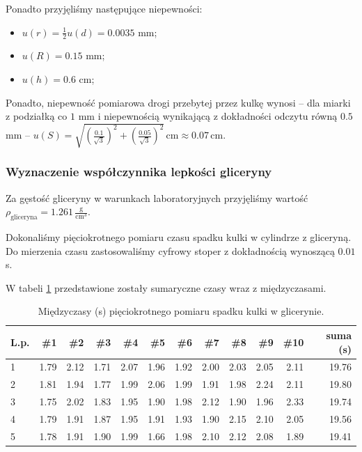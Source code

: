 \documentclass[a4paper]{article}
\begin{document}
Ponadto przyjęliśmy następujące niepewności:

\begin{itemize}
	\item $u(r) = \frac 1 2 u(d) = 0.0035$ mm;
	\item $u(R) = 0.15$ mm; %
	\item $u(h) = 0.6$ cm;
\end{itemize}

Ponadto, niepewność pomiarowa drogi przebytej przez kulkę wynosi
-- dla miarki z podziałką co $1$ mm i niepewnością wynikającą z dokładności odczytu równą $0.5$ mm --
$u(S) = \sqrt{(\frac{0.1}{\sqrt 3})^2 + (\frac{0.05}{\sqrt 3})^2} \, \text{cm}
\approx 0.07 \, \text{cm}$.

\subsubsection{Wyznaczenie współczynnika lepkości gliceryny}

Za gęstość gliceryny w warunkach laboratoryjnych przyjęliśmy wartość $\rho_\text{gliceryna} = 1.261 \, \frac{\text{g}}{\text{cm}^3}$.

Dokonaliśmy pięciokrotnego pomiaru czasu spadku kulki w cylindrze z gliceryną.
Do mierzenia czasu zastosowaliśmy cyfrowy stoper z dokładnością wynoszącą $0.01$ s.

W tabeli \ref{gliceryna} przedstawione zostały sumaryczne czasy wraz z międzyczasami.

\begin{table}[h!]
	\centering
		\begin{tabular}{lrrrrrrrrrrr}
			\toprule
			L.p. &  \#1 & \#2 & \#3 & \#4 & \#5 & \#6 & \#7 & \#8 & \#9 & \#10 & suma (s)\\
			\midrule
			1 &           1.79 &           2.12 &           1.71 &           2.07 &           1.96 &           1.92 &           2.00 &           2.03 &           2.05 &            2.11 & 19.76 \\
			2 &           1.81 &           1.94 &           1.77 &           1.99 &           2.06 &           1.99 &           1.91 &           1.98 &           2.24 &            2.11 & 19.80 \\
			3 &           1.75 &           2.02 &           1.83 &           1.95 &           1.90 &           1.98 &           2.12 &           1.90 &           1.96 &            2.33 & 19.74 \\
			4 &           1.79 &           1.91 &           1.87 &           1.95 &           1.91 &           1.93 &           1.90 &           2.15 &           2.10 &            2.05 & 19.56 \\
			5 &           1.78 &           1.91 &           1.90 &           1.99 &           1.66 &           1.98 &           2.10 &           2.12 &           2.08 &            1.89 & 19.41 \\
			\bottomrule
		\end{tabular}
	\caption{Międzyczasy (s) pięciokrotnego pomiaru spadku kulki w glicerynie.}
	\label{gliceryna}
\end{table}
\end{document}
